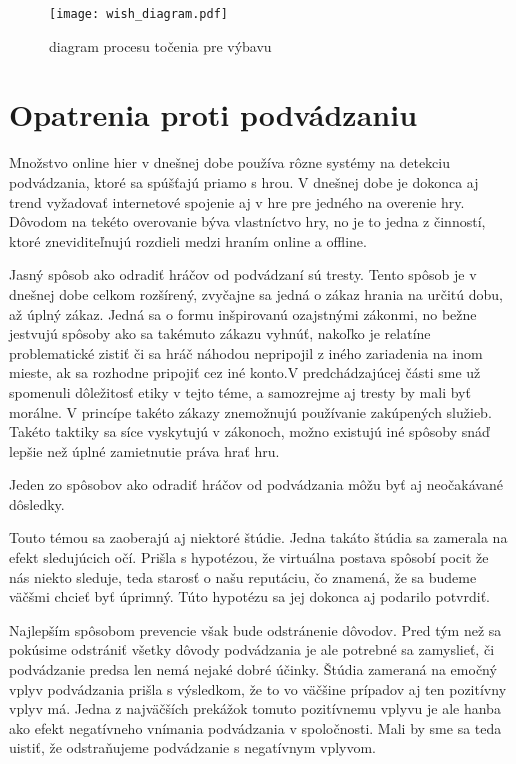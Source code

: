\documentclass[10pt, oneside, slovak,a4paper]{article}
\begin{document}
\begin{figure}[h]
\caption{diagram procesu točenia pre výbavu}
\label{diagram}
\texttt{[image: wish\_diagram.pdf]}
\end{figure}

\section{Opatrenia proti podvádzaniu}
\label{Opatrenia}

Množstvo online hier v dnešnej dobe používa rôzne systémy na detekciu podvádzania, ktoré sa spúšťajú priamo s hrou. V dnešnej dobe je dokonca aj trend vyžadovať internetové spojenie aj v hre pre jedného na overenie hry. Dôvodom na tekéto overovanie býva vlastníctvo hry, no je to jedna z činností, ktoré zneviditeľnujú rozdieli medzi hraním online a offline.

Jasný spôsob ako odradiť hráčov od podvádzaní sú tresty. Tento spôsob je v dnešnej dobe celkom rozšírený, zvyčajne sa jedná o zákaz hrania na určitú dobu, až úplný zákaz. Jedná sa o formu inšpirovanú ozajstnými zákonmi, no bežne jestvujú spôsoby ako sa takémuto zákazu vyhnúť, nakoľko je relatíne problematické zistiť či sa hráč náhodou nepripojil z iného zariadenia na inom mieste, ak sa rozhodne pripojiť cez iné konto.V predchádzajúcej části sme už spomenuli dôležitosť etiky v tejto téme, a samozrejme aj tresty by mali byť morálne. V princípe takéto zákazy znemožnujú používanie zakúpených služieb. Takéto taktiky sa síce vyskytujú v zákonoch, možno existujú iné spôsoby snáď lepšie než úplné zamietnutie práva hrať hru.

Jeden zo spôsobov ako odradiť hráčov od podvádzania môžu byť aj neočakávané dôsledky. 

Touto témou sa zaoberajú aj niektoré štúdie. Jedna takáto štúdia sa zamerala na efekt sledujúcich očí. Prišla s hypotézou, že virtuálna postava spôsobí pocit že nás niekto sleduje, teda starosť o našu reputáciu, čo znamená, že sa budeme väčšmi chcieť byť úprimný. \cite{not_alone} Túto hypotézu sa jej dokonca aj podarilo potvrdiť.

Najlepším spôsobom prevencie však bude odstránenie dôvodov. Pred tým než sa pokúsime odstrániť všetky dôvody podvádzania je ale potrebné sa zamyslieť, či podvádzanie predsa len nemá nejaké dobré účinky. Štúdia zameraná na emočný vplyv podvádzania prišla s výsledkom, že to vo väčšine prípadov aj ten pozitívny vplyv má. Jedna z najväčších prekážok tomuto pozitívnemu vplyvu je ale hanba ako efekt negatívneho vnímania podvádzania v spoločnosti\cite{mood}. Mali by sme sa teda uistiť, že odstraňujeme podvádzanie s negatívnym vplyvom.
\end{document}
